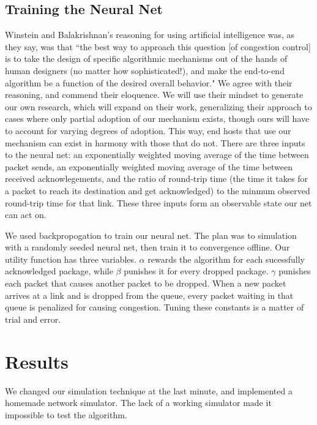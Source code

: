 \documentclass[conference]{IEEEtran}
\begin{document}
\subsection{Training the Neural Net}
Winstein and Balakrishnan's reasoning for using artificial intelligence was, as
they say, was that ``the best way to approach this question [of congestion
control] is to take the design of specific algorithmic mechanisms out of the
hands of human designers (no matter how sophisticated!), and make the end-to-end
algorithm be a function of the desired overall behavior." We agree with their
reasoning, and commend their eloquence. We will use their mindset to generate
our own research, which will expand on their work, generalizing their approach
to cases where only partial adoption of our mechanism exists, though ours will
have to account for varying degrees of adoption. This way, end hosts that use
our mechanism can exist in harmony with those that do not. There are three
inputs to the neural net: an exponentially weighted moving average of the
time between packet sends, an exponentially weighted moving average of the time
between received acknowlegements, and the ratio of round-trip time (the time it
takes for a packet to reach its destination and get acknowledged) to the minmum
observed round-trip time for that link. These three inputs form an observable
state our net can act on.

We used backpropogation to train our neural net. The plan was to
simulation with a randomly seeded neural net, then train it to convergence
offline. Our utility function has three variables. $\alpha$
rewards the algorithm for each sucessfully acknowledged package, while $\beta$
punishes it for every dropped package. $\gamma$ punishes each packet that causes
another packet to be dropped. When a new packet arrives at a link and is dropped
from the queue, every packet waiting in that queue is penalized for causing
congestion. Tuning these constants is a matter of trial and error.

\section{Results}
We changed our simulation technique at the last minute, and implemented a
homemade network simulator. The lack of a working simulator made it impossible
to test the algorithm.
\end{document}
